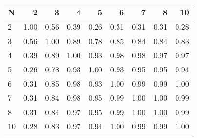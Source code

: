 \begin{tabular}{lrrrrrrrr}
\toprule
N &    2  &    3  &    4  &    5  &    6  &    7  &    8  &    10 \\
\midrule
2  &  1.00 &  0.56 &  0.39 &  0.26 &  0.31 &  0.31 &  0.31 &  0.28 \\
3  &  0.56 &  1.00 &  0.89 &  0.78 &  0.85 &  0.84 &  0.84 &  0.83 \\
4  &  0.39 &  0.89 &  1.00 &  0.93 &  0.98 &  0.98 &  0.97 &  0.97 \\
5  &  0.26 &  0.78 &  0.93 &  1.00 &  0.93 &  0.95 &  0.95 &  0.94 \\
6  &  0.31 &  0.85 &  0.98 &  0.93 &  1.00 &  0.99 &  0.99 &  1.00 \\
7  &  0.31 &  0.84 &  0.98 &  0.95 &  0.99 &  1.00 &  1.00 &  0.99 \\
8  &  0.31 &  0.84 &  0.97 &  0.95 &  0.99 &  1.00 &  1.00 &  0.99 \\
10 &  0.28 &  0.83 &  0.97 &  0.94 &  1.00 &  0.99 &  0.99 &  1.00 \\
\bottomrule
\end{tabular}
